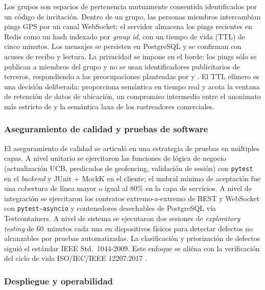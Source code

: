 \documentclass[a4paper,fleqn]{cas-sc}
\newcommand{\UCB}{UCB\xspace}
\begin{document}
	Los grupos son espacios de pertenencia mutuamente consentida identificados por un c\'odigo de invitaci\'on. Dentro de un grupo, las personas miembros intercambian pings GPS por un canal WebSocket; el servidor almacena los pings recientes en Redis como un hash indexado por \emph{group id}, con un tiempo de vida (TTL) de cinco minutos. Los mensajes se persisten en PostgreSQL y se confirman con acuses de recibo y lectura. La privacidad se impone en el borde: los pings s\'olo se publican a miembros del grupo y no se usan identificadores publicitarios de terceros, respondiendo a las preocupaciones planteadas por \citet{shokri2014mobicrowd} y \citet{mckenzie2022privyto}. El TTL ef\'imero es una decisi\'on deliberada: proporciona sem\'antica en tiempo real y acota la ventana de retenci\'on de datos de ubicaci\'on, un compromiso intermedio entre el anonimato m\'as estricto de \citet{li2017locsharing} y la sem\'antica laxa de los rastreadores comerciales.
	
	\subsubsection{Aseguramiento de calidad y pruebas de software}\label{sec:qa}
	
	El aseguramiento de calidad se articul\'o en una estrategia de pruebas en m\'ultiples capas. A nivel unitario se ejercitaron las funciones de l\'ogica de negocio (actualizaci\'on \UCB, predicados de geofencing, validaci\'on de sesi\'on) con \texttt{pytest} en el \emph{backend} y JUnit + MockK en el cliente; el umbral m\'inimo de aceptaci\'on fue una cobertura de l\'inea mayor o igual al $80\%$ en la capa de servicios. A nivel de integraci\'on se ejercitaron los contratos extremo-a-extremo de REST y WebSocket con \texttt{pytest-asyncio} y contenedores desechables de PostgreSQL v\'ia Testcontainers. A nivel de sistema se ejecutaron dos sesiones de \emph{exploratory testing} de 60~minutos cada una en dispositivos f\'isicos para detectar defectos no alcanzables por pruebas automatizadas. La clasificaci\'on y priorizaci\'on de defectos sigui\'o el est\'andar IEEE Std.~1044-2009. Este enfoque se ali\'ena con la verificaci\'on del ciclo de vida ISO/IEC/IEEE 12207:2017 \citep{iso12207}.
	
	\subsubsection{Despliegue y operabilidad}\label{sec:deploy}
	
\end{document}
